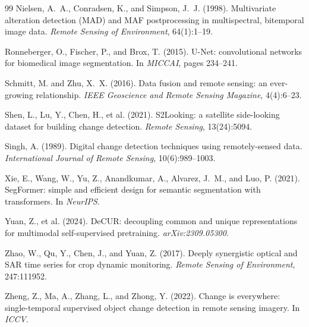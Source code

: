 \documentclass[12pt,a4paper]{article}
\begin{document}
\begin{thebibliography}{99}
Nielsen, A.~A., Conradsen, K., and Simpson, J.~J. (1998).
\newblock Multivariate alteration detection (MAD) and MAF postprocessing in multispectral, bitemporal image data.
\newblock \textit{Remote Sensing of Environment}, 64(1):1--19.

Ronneberger, O., Fischer, P., and Brox, T. (2015).
\newblock U-Net: convolutional networks for biomedical image segmentation.
\newblock In \textit{MICCAI}, pages 234--241.

Schmitt, M. and Zhu, X.~X. (2016).
\newblock Data fusion and remote sensing: an ever-growing relationship.
\newblock \textit{IEEE Geoscience and Remote Sensing Magazine}, 4(4):6--23.

Shen, L., Lu, Y., Chen, H., et al. (2021).
\newblock S2Looking: a satellite side-looking dataset for building change detection.
\newblock \textit{Remote Sensing}, 13(24):5094.

Singh, A. (1989).
\newblock Digital change detection techniques using remotely-sensed data.
\newblock \textit{International Journal of Remote Sensing}, 10(6):989--1003.

Xie, E., Wang, W., Yu, Z., Anandkumar, A., Alvarez, J.~M., and Luo, P. (2021).
\newblock SegFormer: simple and efficient design for semantic segmentation with transformers.
\newblock In \textit{NeurIPS}.

Yuan, Z., et al. (2024).
\newblock DeCUR: decoupling common and unique representations for multimodal self-supervised pretraining.
\newblock \textit{arXiv:2309.05300}.

Zhao, W., Qu, Y., Chen, J., and Yuan, Z. (2017).
\newblock Deeply synergistic optical and SAR time series for crop dynamic monitoring.
\newblock \textit{Remote Sensing of Environment}, 247:111952.

Zheng, Z., Ma, A., Zhang, L., and Zhong, Y. (2022).
\newblock Change is everywhere: single-temporal supervised object change detection in remote sensing imagery.
\newblock In \textit{ICCV}.

\end{thebibliography}
\end{document}
